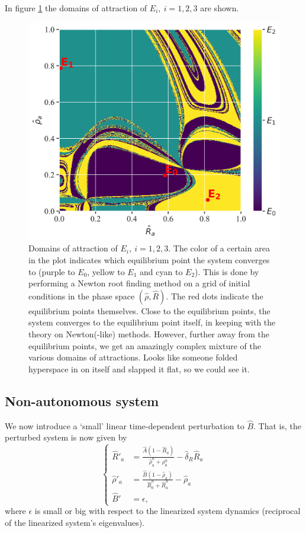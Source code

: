 In figure \ref{fig:cell_biology_domains_of_attraction} the domains of attraction of $E_i, \ i = 1,2,3$ are shown.
\begin{figure}[H]
    \centering
    \includegraphics[width= \textwidth]{figures/cb_domains_of_attraction.png}
    \caption{Domains of attraction of $E_i, \ i = 1,2,3$. The color of a certain area in the plot indicates which equilibrium point the system converges to (purple to $E_0$, yellow to $E_1$ and cyan to $E_2$). 
    This is done by performing a Newton root finding method on a grid of initial conditions in the phase space $(\hat{\rho}, \hat{R})$. The red dots indicate the equilibrium points themselves. 
    Close to the equilibrium points, the system converges to the equilibrium point itself, in keeping with the theory on Newton(-like) methods. However, further away from the equilibrium 
    points, we get an amazingly complex mixture of the various domains of attractions. Looks like someone folded hyperspace in on itself and slapped it flat, so we could see it.}
    \label{fig:cell_biology_domains_of_attraction}
\end{figure}

\subsection{Non-autonomous system}
We now introduce a `small' linear time-dependent perturbation to $\hat{B}$. That is, the perturbed system is now given by
\begin{equation}
    \begin{cases}
        \hat{R}'_a &= \frac{\hat{A} \left(1 - \hat{R}_{a}\right)}{\hat{\rho}_a^{n} + \rho_{0}^{n}}  - \hat{\delta}_{R} \hat{R}_{a}\\
        \hat{\rho}'_a &= \frac{\hat{B} \left(1 - \hat{\rho}_a\right)}{\hat{R}_0^{n} + \hat{R}_{a}^{n}} - \hat{\rho}_a\\
        \hat{B}' &= \epsilon,
    \end{cases}
\label{eq:cell_biology_linear_perturbation}
\end{equation}
where $\epsilon$ is small or big with respect to the linearized system dynamics (reciprocal of the linearized system's eigenvalues). 

